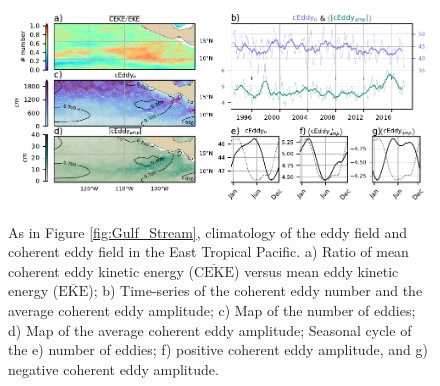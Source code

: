 \documentclass[draft,linenumbers]{agujournal2019}
\newcommand{\MEKE}{\overline{\textrm{EKE}}}
\newcommand{\MCEKE}{\overline{\textrm{CEKE}}}
\begin{document}
	\begin{figure}
	    \centering
	    \includegraphics[width=1\textwidth]{figures/regional_ratios_and_stats_V3_3.pdf}
	    \caption{As in Figure \ref{fig:Gulf_Stream}, climatology of the eddy field and coherent eddy field in the East Tropical Pacific. a) Ratio of mean coherent eddy kinetic energy ($\MCEKE$) versus mean eddy kinetic energy ($\MEKE$); b) Time-series of the coherent eddy number and the average coherent eddy amplitude; c) Map of the number of eddies; d) Map of the average coherent eddy amplitude; Seasonal cycle of the e) number of eddies; f) positive coherent eddy amplitude, and g) negative coherent eddy amplitude.}
	    \label{fig:tehuantepec}
	\end{figure}	




\end{document}
